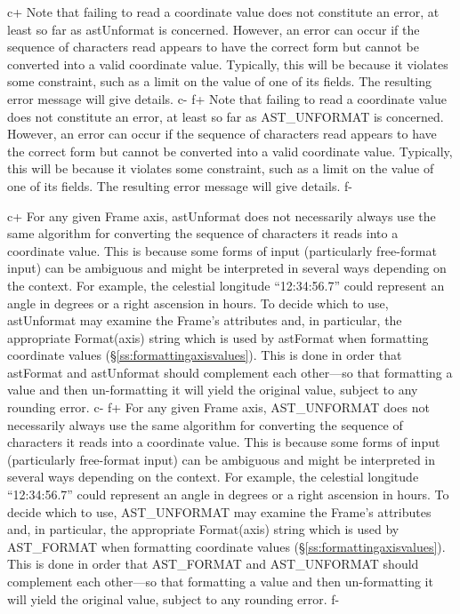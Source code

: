 \documentclass[twoside,11pt]{starlink}
\providecommand{\secref}[1]{\S\ref{#1}}
\begin{document}
c+
Note that failing to read a coordinate value does not constitute an
error, at least so far as astUnformat is concerned. However, an error
can occur if the sequence of characters read appears to have the
correct form but cannot be converted into a valid coordinate
value. Typically, this will be because it violates some constraint,
such as a limit on the value of one of its fields. The resulting error
message will give details.
c-
f+
Note that failing to read a coordinate value does not constitute an
error, at least so far as AST\_UNFORMAT is concerned. However, an
error can occur if the sequence of characters read appears to have the
correct form but cannot be converted into a valid coordinate
value. Typically, this will be because it violates some constraint,
such as a limit on the value of one of its fields. The resulting error
message will give details.
f-

c+
For any given Frame axis, astUnformat does not necessarily always use
the same algorithm for converting the sequence of characters it reads
into a coordinate value. This is because some forms of input
(particularly free-format input) can be ambiguous and might be
interpreted in several ways depending on the context. For example, the
celestial longitude ``12:34:56.7'' could represent an angle in degrees
or a right ascension in hours. To decide which to use, astUnformat may
examine the Frame's attributes and, in particular, the appropriate
Format(axis) string which is used by astFormat when formatting
coordinate values (\secref{ss:formattingaxisvalues}). This is done in
order that astFormat and astUnformat should complement each other---so
that formatting a value and then un-formatting it will yield the
original value, subject to any rounding error.
c-
f+
For any given Frame axis, AST\_UNFORMAT does not necessarily always
use the same algorithm for converting the sequence of characters it
reads into a coordinate value. This is because some forms of input
(particularly free-format input) can be ambiguous and might be
interpreted in several ways depending on the context. For example, the
celestial longitude ``12:34:56.7'' could represent an angle in degrees
or a right ascension in hours. To decide which to use, AST\_UNFORMAT
may examine the Frame's attributes and, in particular, the appropriate
Format(axis) string which is used by AST\_FORMAT when formatting
coordinate values (\secref{ss:formattingaxisvalues}). This is done in
order that AST\_FORMAT and AST\_UNFORMAT should complement each
other---so that formatting a value and then un-formatting it will
yield the original value, subject to any rounding error.
f-
\end{document}
